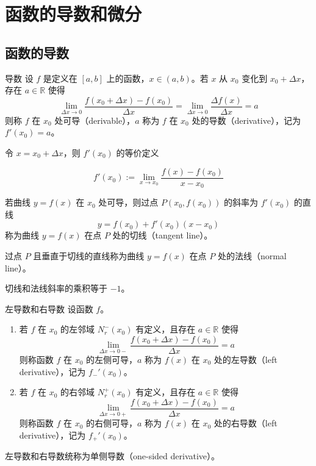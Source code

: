 \chapter{函数的导数和微分}


\section{函数的导数}
\begin{definition}{导数}
  设 $f$ 是定义在 $[a, b]$ 上的函数，$x\in (a, b)$。若 $x$ 从 $x_0$ 变化到 $x_0 + \Delta x$，存在 $a\in \mathbb{R}$ 使得
  \[\lim_{\Delta x\to 0}\frac{f(x_0+\Delta x) - f(x_0)}{\Delta x} = \lim_{\Delta x\to 0}\frac{\Delta f(x)}{\Delta x} = a\]
  则称 $f$ 在 $x_0$ 处可导（derivable），$a$ 称为 $f$ 在 $x_0$ 处的导数（derivative），记为 $f'(x_0) = a$。
\end{definition}

令 $x = x_0 + \Delta x$，则 $f'(x_0)$ 的等价定义

\[f'(x_0) := \lim_{x\to x_0}\frac{f(x) - f(x_0)}{x - x_0}\]

\begin{definition}
  若曲线 $y = f(x)$ 在 $x_0$ 处可导，则过点 $P(x_0, f(x_0))$ 的斜率为 $f'(x_0)$ 的直线
  \[y = f(x_0) + f'(x_0)(x - x_0)\]
  称为曲线 $y = f(x)$ 在点 $P$ 处的切线（tangent line）。

  过点 $P$ 且垂直于切线的直线称为曲线 $y = f(x)$ 在点 $P$ 处的法线（normal line）。

  切线和法线斜率的乘积等于 $-1$。
\end{definition}


\begin{definition}{左导数和右导数}
  设函数 $f$。
  \begin{enumerate}
    \item 若 $f$ 在 $x_0$ 的左邻域 $N_r^-(x_0)$ 有定义，且存在 $a\in \mathbb{R}$ 使得
          \[\lim_{\Delta x\to 0-}\frac{f(x_0+\Delta x) - f(x_0)}{\Delta x} = a\]
          则称函数 $f$ 在 $x_0$ 的左侧可导，$a$ 称为 $f(x)$ 在 $x_0$ 处的左导数（left derivative），记为 $f_{-}'(x_0)$。
    \item 若 $f$ 在 $x_0$ 的右邻域 $N_r^+(x_0)$ 有定义，且存在 $a\in \mathbb{R}$ 使得
          \[\lim_{\Delta x\to 0+}\frac{f(x_0+\Delta x) - f(x_0)}{\Delta x} = a\]
          则称函数 $f$ 在 $x_0$ 的右侧可导，$a$ 称为 $f(x)$ 在 $x_0$ 处的右导数（left derivative），记为 $f_{+}'(x_0)$。
  \end{enumerate}
  左导数和右导数统称为单侧导数（one-sided derivative）。
\end{definition}

